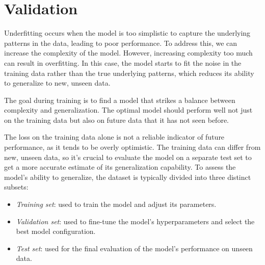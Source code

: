 \section{Validation}

Underfitting occurs when the model is too simplistic to capture the underlying patterns in the data, leading to poor performance. 
To address this, we can increase the complexity of the model. 
However, increasing complexity too much can result in overfitting. 
In this case, the model starts to fit the noise in the training data rather than the true underlying patterns, which reduces its ability to generalize to new, unseen data.

The goal during training is to find a model that strikes a balance between complexity and generalization. 
The optimal model should perform well not just on the training data but also on future data that it has not seen before.

The loss on the training data alone is not a reliable indicator of future performance, as it tends to be overly optimistic. 
The training data can differ from new, unseen data, so it's crucial to evaluate the model on a separate test set to get a more accurate estimate of its generalization capability.
\noindent To assess the model's ability to generalize, the dataset is typically divided into three distinct subsets:
\begin{itemize}
    \item \textit{Training set}: used to train the model and adjust its parameters.
    \item \textit{Validation set}: used to fine-tune the model's hyperparameters and select the best model configuration.
    \item \textit{Test set}: used for the final evaluation of the model's performance on unseen data.
\end{itemize}

